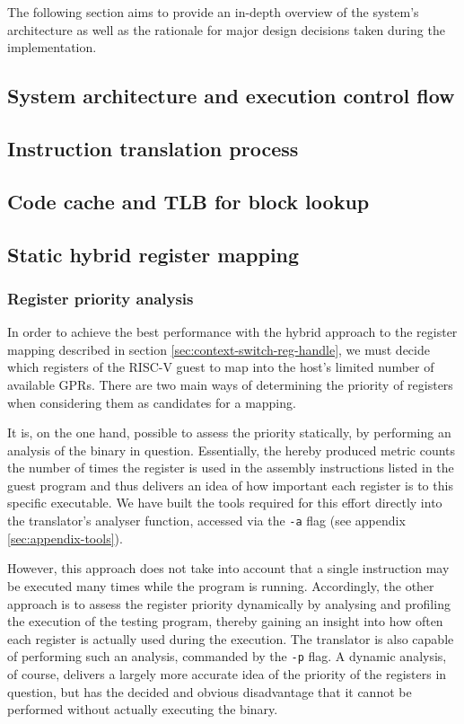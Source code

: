 The following section aims to provide an in-depth overview of the system's architecture as well as the rationale for major design decisions taken during the implementation.

\subsection{System architecture and execution control flow}

\subsection{Instruction translation process}

\subsection{Code cache and TLB for block lookup}

\subsection{Static hybrid register mapping}
\subsubsection{Register priority analysis}
In order to achieve the best performance with the hybrid approach to the register mapping described in section \vref{sec:context-switch-reg-handle}, we must decide which registers of the RISC-V guest to map into the host's limited number of available GPRs.
There are two main ways of determining the priority of registers when considering them as candidates for a mapping.

It is, on the one hand, possible to assess the priority statically, by performing an analysis of the binary in question.
Essentially, the hereby produced metric counts the number of times the register is used in the assembly instructions listed in the guest program and thus delivers an idea of how important each register is to this specific executable.
We have built the tools required for this effort directly into the translator's analyser function, accessed via the \texttt{-a} flag (see appendix \ref{sec:appendix-tools}).

However, this approach does not take into account that a single instruction may be executed many times while the program is running.
Accordingly, the other approach is to assess the register priority dynamically by analysing and profiling the execution of the testing program, thereby gaining an insight into how often each register is actually used during the execution.
The translator is also capable of performing such an analysis, commanded by the \texttt{-p} flag.
A dynamic analysis, of course, delivers a largely more accurate idea of the priority of the registers in question, but has the decided and obvious disadvantage that it cannot be performed without actually executing the binary.

